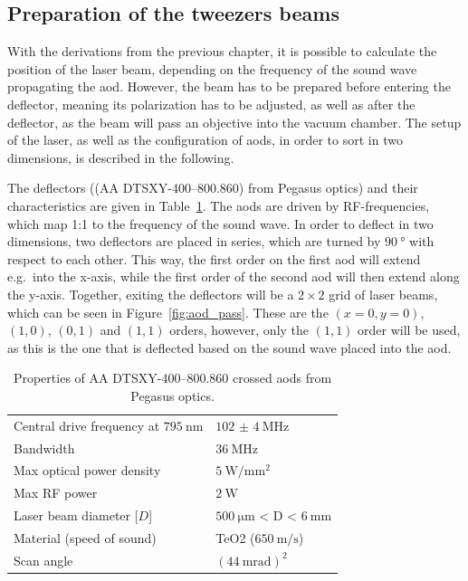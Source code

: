 \subsection{Preparation of the tweezers beams}%
\label{sec:tweezer_beams}

With the derivations from the previous chapter, it is possible to calculate the position of the laser beam, depending on the frequency of the sound wave propagating the \ac{aod}. However, the beam has to be prepared before entering the deflector, meaning its polarization has to be adjusted, as well as after the deflector, as the beam will pass an objective into the vacuum chamber. The setup of the laser, as well as the configuration of \acp{aod}, in order to sort in two dimensions, is described in the following.

The deflectors ((AA DTSXY-400--800.860) from Pegasus optics) and their characteristics are given in Table~\ref{tbl:pegasus_aod}. The \acp{aod} are driven by RF-frequencies, which map 1:1 to the frequency of the sound wave.  In order to deflect in two dimensions, two deflectors are placed in series, which are turned by $\SI{90}{\degree}$ with respect to each other. This way, the first order on the first \ac{aod} will extend e.g.\ into the x-axis, while the first order of the second \ac{aod} will then extend along the y-axis. Together, exiting the deflectors will be a $2\times2$ grid of laser beams, which can be seen in Figure~\ref{fig:aod_pass}. These are the $(x=0, y=0)$, $(1, 0)$, $(0, 1)$ and $(1, 1)$ orders, however, only the $(1,1)$ order will be used, as this is the one that is deflected based on the sound wave placed into the \ac{aod}.

\begin{table}[h]%
\label{tbl:pegasus_aod}
\centering
\begin{tabular}{l l}
	\toprule \toprule
	Central drive frequency at $\SI{795}{\nano\meter}$ & $\SI{102(4)}{\mega\hertz}$ \\
	Bandwidth & $\SI{36}{\mega\hertz}$ \\
	Max optical power density & $\SI{5}{\watt\per\milli\meter\squared}$ \\
	Max RF power & $\SI{2}{\watt}$ \\
	Laser beam diameter [$D$] & $\SI{500}{\micro\meter}$ < D < $\SI{6}{\milli\meter}$ \\
	Material (speed of sound) & TeO2 ($\SI{650}{\meter\per\second}$) \\
	Scan angle & ${(\SI{44}{\milli\radian})}^2$ \\
	\bottomrule \bottomrule
\end{tabular}
\caption{Properties of AA DTSXY-400--800.860 crossed \acp{aod} from Pegasus optics.}
\end{table}

